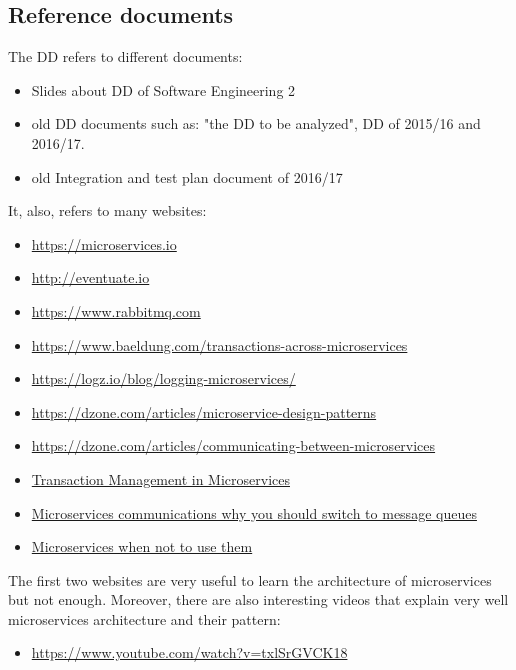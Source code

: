 \subsection{Reference documents}
The DD refers to different documents:
\begin{itemize}
\item Slides about DD of Software Engineering 2
\item old DD documents such as: "the DD to be analyzed", DD of 2015/16 and 2016/17.
\item old Integration and test plan document of 2016/17
\end{itemize}
It, also, refers to many websites:
\begin{itemize}
\item \url{https://microservices.io}
\item \url{http://eventuate.io}
\item \url{https://www.rabbitmq.com}
\item \url{https://www.baeldung.com/transactions-across-microservices}
\item \url{https://logz.io/blog/logging-microservices/}
\item \url{https://dzone.com/articles/microservice-design-patterns}
\item \url{https://dzone.com/articles/communicating-between-microservices}
\item \href{https://medium.com/@walkingtreetech/transaction-management-in-microservices-ab09b0cb803b}{Transaction Management in Microservices}
\item \href{https://dev.to/matteojoliveau/microservices-communications-why-you-should-switch-to-message-queues--48ia}{Microservices communications why you should switch to message queues}
\item \href{https://www.qualogy.com/techblog/it-development-and-operations/microservices-when-not-to-use-them...#}{Microservices when not to use them}
\end{itemize}
The first two websites are very useful to learn the architecture of microservices but not enough. Moreover, there are also interesting videos that explain very well microservices architecture and their pattern:
\begin{itemize}
\item \url{https://www.youtube.com/watch?v=txlSrGVCK18}
\end{itemize}


